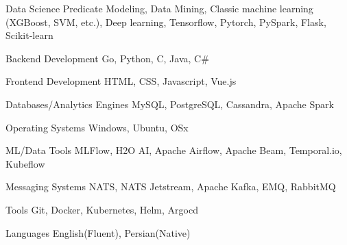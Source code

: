 

\begin{cvskills}

  \cvskill
    {Data Science} %
    {
      Predicate Modeling, Data Mining,
      Classic machine learning (XGBoost, SVM, etc.),
      Deep learning, Tensorflow, Pytorch, PySpark, Flask, Scikit‐learn
    } %

  \cvskill
    {Backend Development} %
    {Go, Python, C, Java, C\#} %

  \cvskill
    {Frontend Development} %
    {HTML, CSS, Javascript, Vue.js} %

  \cvskill
    {Databases/Analytics Engines} %
    {MySQL, PostgreSQL, Cassandra, Apache Spark} %

  \cvskill
    {Operating Systems} %
    {Windows, Ubuntu, OSx} %

  \cvskill
    {ML/Data Tools} %
    {MLFlow, H2O AI, Apache Airflow, Apache Beam, Temporal.io, Kubeflow} %

  \cvskill
    {Messaging Systems} %
    {NATS, NATS Jetstream, Apache Kafka, EMQ, RabbitMQ} %

  \cvskill
    {Tools} %
    {Git, Docker, Kubernetes, Helm, Argocd} %

  \cvskill
    {Languages} %
    {English(Fluent), Persian(Native)} %

\end{cvskills}
